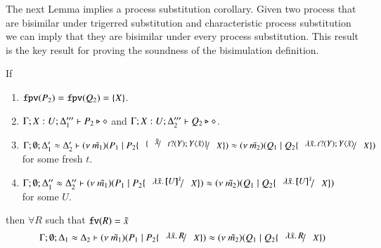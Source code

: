 \begin{comment}
	\noi {\bf Induction step:}

	\noi - Case: $Q \Par R \by{\bactout{s}{(x) P}} Q' \Par R$ and
	\[
		\Gamma; \emptyset; \Delta_1 \proves Q \Par R \hastype \Proc
	\]
	\noi Type rule $\trule{Par}$ implies
	\begin{eqnarray}
		\Gamma; \emptyset; \Delta_1' &\proves& Q \hastype \Proc\\
		\Gamma; \emptyset; \Delta_1'' &\proves& R \hastype \Proc \label{lem:aux3}
	\end{eqnarray}
	\noi From the induction hypothesis we get that 
	\begin{eqnarray*}
		\Gamma; \emptyset; \Delta_2' \proves Q' \Par P \hastype \Proc
	\end{eqnarray*}
	we apply rule $\trule{Par}$ to the latter judgement and judgement~\ref{lem:aux3} to get
	\begin{eqnarray*}
		\Gamma; \emptyset; \Delta_2' \cup \Delta'' \proves Q' \Par R \Par P \hastype \Proc
	\end{eqnarray*}

	The rest of the cases enjoy similar argumentation.
\end{proof}

\end{comment}


The next Lemma implies a process substitution corollary.
Given two process that are bisimilar under trigerred substitution
and characteristic process substitution we can imply that they are
bisimilar under every process substitution. This result is
the key result for proving the soundness of the bisimulation
definition.

\begin{lemma}\rm
	\label{lem:subst_equiv}
	If 
%
	\begin{enumerate}
		\item	$\mathtt{fpv}(P_2) = \mathtt{fpv}(Q_2) = \{X\}$.
		\item	$\Gamma; X: U; \Delta_1''' \vdash P_2 \triangleright \diamond$ and $\Gamma; X: U; \Delta_2''' \vdash Q_2 \triangleright \diamond$.
		\item	$\horel{\Gamma}{\Delta_1'}{\newsp{\tilde{m_1}}{P_1 \Par P_2 \subst{\subst{\tilde{x}}{\binp{t}{Y} \appl{Y}{\tilde{x}}}}{X}}}{\wb}{\Delta_2'}{\newsp{\tilde{m_2}}{Q_1 \Par Q_2 \subst{\abs{\tilde{x}}{\binp{t}{Y} \appl{Y}{\tilde{x}}}}{X}}}$ \\
			for some fresh $t$.

		\item	$\horel{\Gamma}{\Delta_1''}{\newsp{\tilde{m_1}}{P_1 \Par P_2 \subst{\abs{\tilde{x}}{\map{U}^{\tilde{x}}}}{X}}}{\wb}{\Delta_2''}{\newsp{\tilde{m_2}}{Q_1 \Par Q_2 \subst{\abs{\tilde{x}}{\map{U}^{\tilde{x}}}}{X}}}$\\
			for some $U$.
	\end{enumerate}
%
	then $\forall R$ such that $\mathtt{fv}(R) = \tilde{x}$
\[
	\horel{\Gamma}{\Delta_1}{\newsp{\tilde{m_1}}{P_1 \Par P_2 \subst{\abs{\tilde{x}}{R}}{X}}}
	{\wb}
	{\Delta_2}{\newsp{\tilde{m_2}}{Q_1 \Par Q_2 \subst{\abs{\tilde{x}}{R}}{X}}}
\]
\end{lemma}

